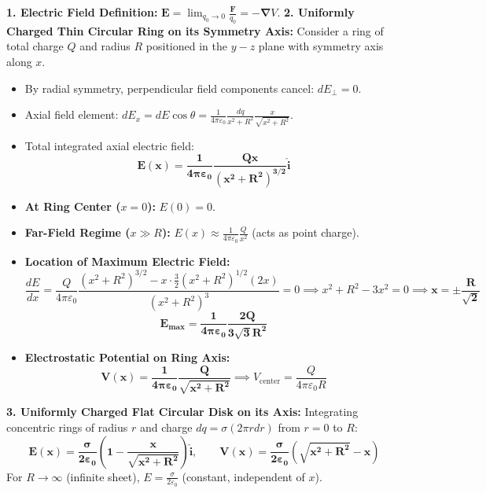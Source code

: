 \documentclass[10pt,a4paper]{article}
\begin{document}
\begin{formulabox}
\textbf{1. Electric Field Definition:}
$\mathbf{E} = \lim_{q_0 \to 0} \frac{\mathbf{F}}{q_0} = -\boldsymbol{\nabla} V$.
\textbf{2. Uniformly Charged Thin Circular Ring on its Symmetry Axis:}
Consider a ring of total charge $Q$ and radius $R$ positioned in the $y-z$ plane with symmetry axis along $x$.
\begin{itemize}
  \item By radial symmetry, perpendicular field components cancel: $dE_\perp = 0$.
  \item Axial field element: $dE_x = dE \cos\theta = \frac{1}{4\pi\varepsilon_0} \frac{dq}{x^2 + R^2} \frac{x}{\sqrt{x^2 + R^2}}$.
  \item Total integrated axial electric field:
  \begin{equation}
    \mathbf{E(x) = \frac{1}{4\pi\varepsilon_0} \frac{Q x}{(x^2 + R^2)^{3/2}} \hat{\mathbf{i}}}
  \end{equation}
  \item \textbf{At Ring Center ($x=0$):} $E(0) = 0$.
  \item \textbf{Far-Field Regime ($x \gg R$):} $E(x) \approx \frac{1}{4\pi\varepsilon_0}\frac{Q}{x^2}$ (acts as point charge).
  \item \textbf{Location of Maximum Electric Field:}
  \begin{equation}
    \frac{dE}{dx} = \frac{Q}{4\pi\varepsilon_0} \frac{(x^2 + R^2)^{3/2} - x \cdot \frac{3}{2}(x^2 + R^2)^{1/2}(2x)}{(x^2 + R^2)^3} = 0 \implies x^2 + R^2 - 3x^2 = 0 \implies \mathbf{x = \pm \frac{R}{\sqrt{2}}}
  \end{equation}
  \begin{equation}
    \mathbf{E_{\max} = \frac{1}{4\pi\varepsilon_0} \frac{2 Q}{3\sqrt{3} R^2}}
  \end{equation}
  \item \textbf{Electrostatic Potential on Ring Axis:}
  \begin{equation}
    \mathbf{V(x) = \frac{1}{4\pi\varepsilon_0} \frac{Q}{\sqrt{x^2 + R^2}}} \implies V_{\text{center}} = \frac{Q}{4\pi\varepsilon_0 R}
  \end{equation}
\end{itemize}
\textbf{3. Uniformly Charged Flat Circular Disk on its Axis:}
Integrating concentric rings of radius $r$ and charge $dq = \sigma (2\pi r dr)$ from $r=0$ to $R$:
\begin{equation}
  \mathbf{E(x) = \frac{\sigma}{2\varepsilon_0} \left(1 - \frac{x}{\sqrt{x^2 + R^2}}\right) \hat{\mathbf{i}}}, \qquad \mathbf{V(x) = \frac{\sigma}{2\varepsilon_0} \left(\sqrt{x^2 + R^2} - x\right)}
\end{equation}
For $R \to \infty$ (infinite sheet), $E = \frac{\sigma}{2\varepsilon_0}$ (constant, independent of $x$).
\end{formulabox}
\end{document}
